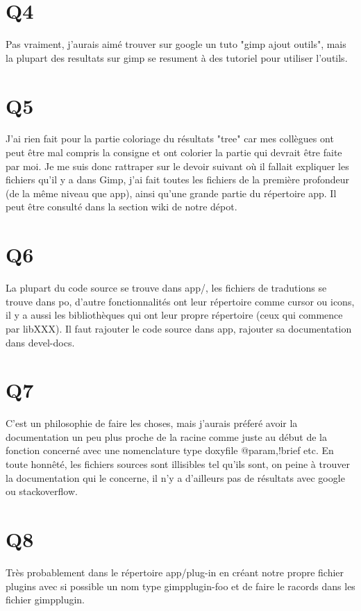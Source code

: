 \documentclass[12pt, letterpaper]{article}
\begin{document}
\section{Q4}
Pas vraiment, j'aurais aimé trouver sur google un tuto "gimp ajout outils", mais la plupart des resultats sur gimp se resument à des tutoriel pour utiliser l'outils.

\section{Q5}
J'ai rien fait pour la partie coloriage du résultats "tree" car mes collègues ont peut être mal compris la consigne et ont colorier la partie qui devrait être faite par moi. 
Je me suis donc rattraper sur le devoir suivant où il fallait expliquer les fichiers qu'il y a dans Gimp, j'ai fait toutes les fichiers de la première profondeur (de la même niveau que app), ainsi qu'une grande partie du répertoire app.
Il peut être consulté dans la section wiki de notre dépot. 

\section{Q6}
La plupart du code source se trouve dans app/, les fichiers de tradutions se trouve dans po, d'autre fonctionnalités ont leur répertoire comme cursor ou icons, il y a aussi les bibliothèques qui ont leur propre répertoire (ceux qui commence par libXXX).
Il faut rajouter le code source dans app, rajouter sa documentation dans devel-docs.

\section{Q7}
C'est un philosophie de faire les choses, mais j'aurais préferé avoir la documentation un peu plus proche de la racine comme juste au début de la fonction concerné avec une nomenclature type doxyfile @param,!brief etc. 
En toute honnêté, les fichiers sources sont illisibles tel qu'ils sont, on peine à trouver la documentation qui le concerne, il n'y a d'ailleurs pas de résultats avec google ou stackoverflow.

\section{Q8}
Très probablement dans le répertoire app/plug-in en créant notre propre fichier plugins avec si possible un nom type gimpplugin-foo et de faire le racords dans les fichier gimpplugin.
\end{document}
